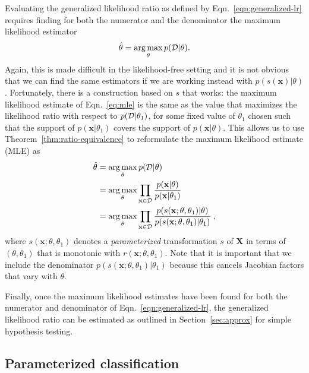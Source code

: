 \documentclass[12pt]{article}
\DeclareMathOperator*{\argmax}{arg\,max}
\numberwithin{equation}{section}
\theoremstyle{plain}
\begin{document}
Evaluating the generalized likelihood ratio as defined by
Eqn.~\ref{eqn:generalized-lr} requires finding for both the numerator and the
denominator the maximum likelihood estimator
\begin{equation}\label{eq:mle}
    \hat{\theta} = \argmax_\theta p({\cal D} | \theta).
\end{equation}
Again, this is made difficult in the likelihood-free setting and it is not
obvious that we can find the same estimators if we are working instead with
$p(s(\mathbf{x})|\theta)$. Fortunately, there is a construction
based on $s$ that works: the maximum likelihood estimate of Eqn.~\ref{eq:mle} is
the same as the value that maximizes the likelihood ratio with respect to
$p({\cal D}|\theta_1)$, for some fixed value of $\theta_1$ chosen such that the support of $p(\mathbf{x}|\theta_1)$ covers the support of $p(\mathbf{x}|\theta)$.
This allows us to
use Theorem~\ref{thm:ratio-equivalence} to reformulate the maximum likelihood
estimate (MLE) as
\begin{align}\label{eq:mle_withs}
\hat{\theta} &= \argmax_\theta  p({\cal D} | \theta) \nonumber \\
&= \argmax_\theta  \prod_{\mathbf{x} \in {\cal D}} \frac{p(\mathbf{x}| \theta)}{p(\mathbf{x}|\theta_1)} \nonumber \\
&= \argmax_\theta  \prod_{\mathbf{x} \in {\cal D}} \frac{p(s(\mathbf{x}; \theta, \theta_1) | \theta)}{p(s(\mathbf{x}; \theta, \theta_1) |\theta_1)} \;,
\end{align}
where $s(\mathbf{x};\theta,\theta_1)$ denotes a \textit{parameterized}
transformation $s$ of $\mathbf{X}$ in terms of $(\theta,\theta_1)$ that is monotonic
with $r(\mathbf{x};\theta,\theta_1)$. Note that it is important that we include
the denominator $p(s(\mathbf{x}; \theta, \theta_1) |\theta_1)$ because this
cancels Jacobian factors that vary with $\theta$.

Finally, once the maximum likelihood estimates have been found for both the numerator
and denominator of Eqn.~\ref{eqn:generalized-lr}, the generalized likelihood
ratio can be estimated as outlined in Section~\ref{sec:approx}
for simple hypothesis testing.



\subsection{Parameterized classification}
\label{sec:param-clf}
\end{document}
